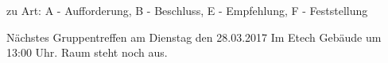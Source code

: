 \documentclass[
   draft=false
  ,paper=a4
  ,twoside=false
  ,fontsize=11pt
  ,headsepline
  ,DIV11
  ,parskip=full+
]{scrartcl} %
\begin{document}
\vspace{-2.5em}
\footnotesize
zu Art: A - Aufforderung, B - Beschluss, E - Empfehlung, F - Feststellung \\
\normalsize

Nächstes Gruppentreffen am Dienstag den 28.03.2017 Im Etech Gebäude 
um 13:00 Uhr. Raum steht noch aus.


\flushleft
\end{document}
